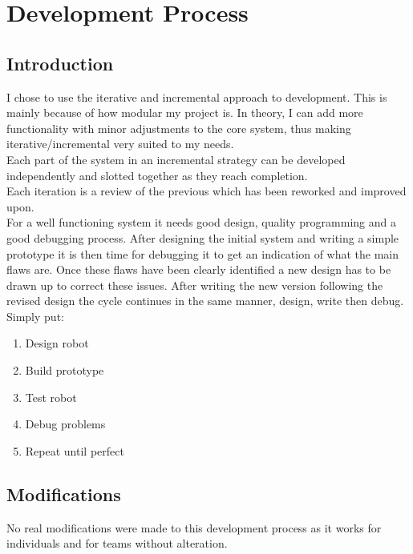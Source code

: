 \chapter{Development Process}

\section{Introduction}
I chose to use the iterative and incremental approach to development.  This is mainly because of how modular my project is.  In theory, I can add more functionality with minor adjustments to the core system, thus making iterative/incremental very suited to my needs.
\\Each part of the system in an incremental strategy can be developed independently and slotted together as they reach completion.
\\Each iteration is a review of the previous which has been reworked and improved upon.
\\For a well functioning system it needs good design, quality programming and a good debugging process.  After designing the initial system and writing a simple prototype it is then time for debugging it to get an indication of what the main flaws are.  Once these flaws have been clearly identified a new design has to be drawn up to correct these issues.  After writing the new version following the revised design the cycle continues in the same manner, design, write then debug.
\\Simply put:
\begin{enumerate}
\item Design robot
\item Build prototype
\item Test robot
\item Debug problems
\item Repeat until perfect
\end{enumerate}

\section{Modifications}
No real modifications were made to this development process as it works for individuals and for teams without alteration.

